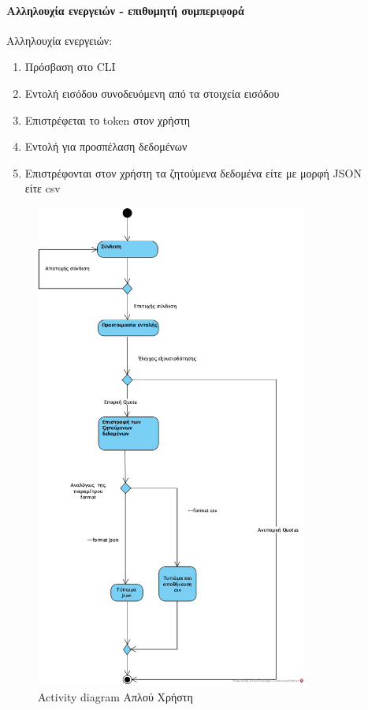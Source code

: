 \documentclass[a4paper,12pt, oneside]{article}
\begin{document}
\paragraph{Αλληλουχία ενεργειών - επιθυμητή συμπεριφορά}
Αλληλουχία ενεργειών: \\
\begin{enumerate}
	\item Πρόσβαση στο \textlatin{CLI}
	\item Εντολή εισόδου συνοδευόμενη από τα στοιχεία εισόδου
	\item Επιστρέφεται το token στον χρήστη
	\item Εντολή για προσπέλαση δεδομένων
	\item Επιστρέφονται στον χρήστη τα ζητούμενα δεδομένα είτε με μορφή \textlatin{JSON} \\είτε \textlatin{csv}
\end{enumerate} 

\begin{figure}[h]
\includegraphics[width=0.8\textwidth]{./UML/Activity_Diagram_User.png}
\caption{\textlatin{Activity diagram} Απλού Χρήστη}
\centering
\end{figure}
\clearpage
\end{document}
